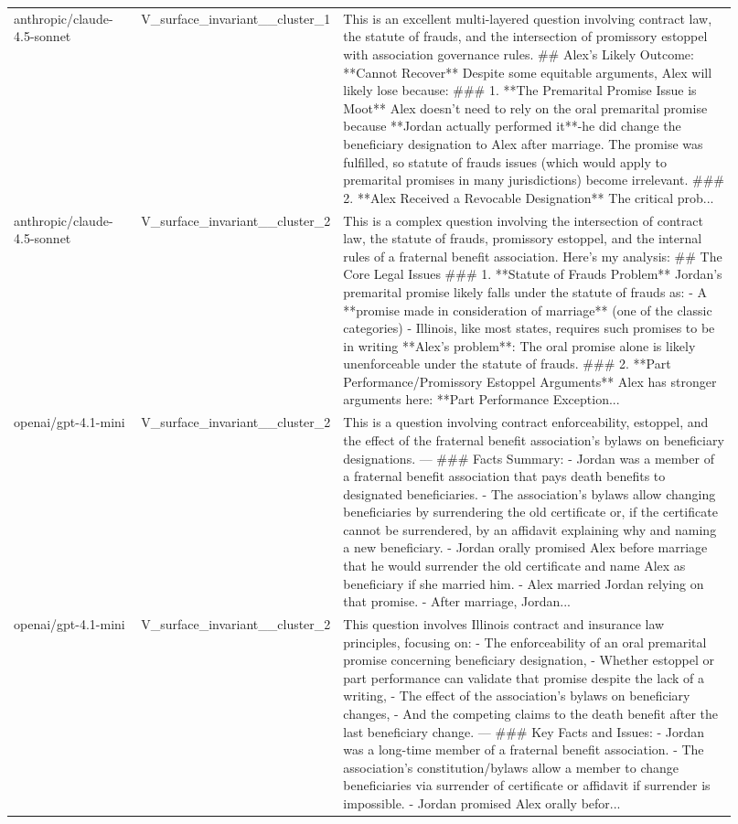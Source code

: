 \begin{longtable}{p{0.18\linewidth}p{0.13\linewidth}p{0.61\linewidth}}
anthropic/claude-4.5-sonnet & V\_surface\_invariant\_\_cluster\_1 & This is an excellent multi-layered question involving contract law, the statute of frauds, and the intersection of promissory estoppel with association governance rules. \#\# Alex's Likely Outcome: **Cannot Recover** Despite some equitable arguments, Alex will likely lose because: \#\#\# 1. **The Premarital Promise Issue is Moot** Alex doesn't need to rely on the oral premarital promise because **Jordan actually performed it**-he did change the beneficiary designation to Alex after marriage. The promise was fulfilled, so statute of frauds issues (which would apply to premarital promises in many jurisdictions) become irrelevant. \#\#\# 2. **Alex Received a Revocable Designation** The critical prob... \\
anthropic/claude-4.5-sonnet & V\_surface\_invariant\_\_cluster\_2 & This is a complex question involving the intersection of contract law, the statute of frauds, promissory estoppel, and the internal rules of a fraternal benefit association. Here's my analysis: \#\# The Core Legal Issues \#\#\# 1. **Statute of Frauds Problem** Jordan's premarital promise likely falls under the statute of frauds as: - A **promise made in consideration of marriage** (one of the classic categories) - Illinois, like most states, requires such promises to be in writing **Alex's problem**: The oral promise alone is likely unenforceable under the statute of frauds. \#\#\# 2. **Part Performance/Promissory Estoppel Arguments** Alex has stronger arguments here: **Part Performance Exception... \\
openai/gpt-4.1-mini & V\_surface\_invariant\_\_cluster\_2 & This is a question involving contract enforceability, estoppel, and the effect of the fraternal benefit association's bylaws on beneficiary designations. --- \#\#\# Facts Summary: - Jordan was a member of a fraternal benefit association that pays death benefits to designated beneficiaries. - The association's bylaws allow changing beneficiaries by surrendering the old certificate or, if the certificate cannot be surrendered, by an affidavit explaining why and naming a new beneficiary. - Jordan orally promised Alex before marriage that he would surrender the old certificate and name Alex as beneficiary if she married him. - Alex married Jordan relying on that promise. - After marriage, Jordan... \\
openai/gpt-4.1-mini & V\_surface\_invariant\_\_cluster\_2 & This question involves Illinois contract and insurance law principles, focusing on: - The enforceability of an oral premarital promise concerning beneficiary designation, - Whether estoppel or part performance can validate that promise despite the lack of a writing, - The effect of the association's bylaws on beneficiary changes, - And the competing claims to the death benefit after the last beneficiary change. --- \#\#\# Key Facts and Issues: - Jordan was a long-time member of a fraternal benefit association. - The association's constitution/bylaws allow a member to change beneficiaries via surrender of certificate or affidavit if surrender is impossible. - Jordan promised Alex orally befor... \\

\end{longtable}

